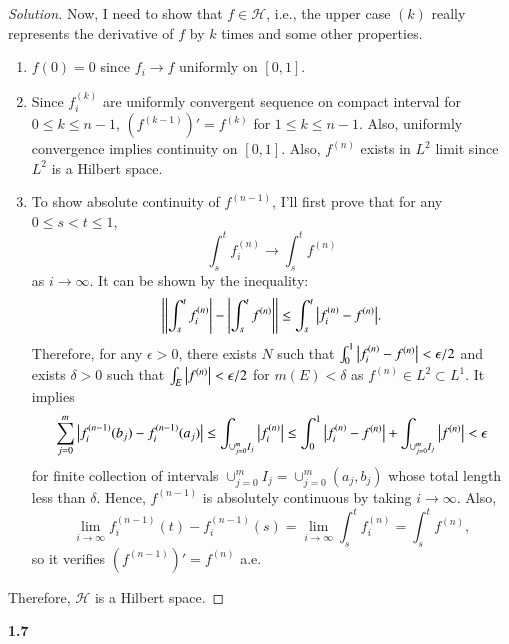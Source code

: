 \documentclass[a4paper, 12pt]{article}
\theoremstyle{Mydefinition}
\theoremstyle{Mytheorem}
\begin{document}
\begin{proof}[Solution]
Now, I need to show that $f\in \mathscr{H}$, i.e., the upper case $(k)$ really represents the derivative of $f$ by $k$ times and some other properties.
\begin{enumerate}
    \item $f(0) = 0$ since $f_i\rightarrow f$ uniformly on $[0,1]$.
    \item Since $f_i^{(k)}$ are uniformly convergent sequence on compact interval for $0\leq k\leq n-1$, $(f^{(k-1)})' = f^{(k)}$ for $1\leq k\leq n-1$. Also, uniformly convergence implies continuity on $[0,1]$. Also, $f^{(n)}$ exists in $L^2$ limit since $L^2$ is a Hilbert space.
    \item To show absolute continuity of $f^{(n-1)}$, I'll first prove that for any $0\leq s<t\leq 1$,
    \begin{equation}
        \int_s^t f_i^{(n)}\rightarrow\int_s^t f^{(n)}
    \end{equation}
    as $i\rightarrow \infty$. It can be shown by the inequality:
    \begin{equation}
        \abs{\abs{\int_s^t f_i^{(n)}}-\abs{\int_s^t f^{(n)}}}\leq \int_s^t \abs{f_i^{(n)} - f^{(n)}}.
    \end{equation}
    Therefore, for any $\epsilon>0$, there exists $N$ such that $\int_0^1 \abs{f_i^{(n)} - f^{(n)}}<\epsilon/2$ and exists $\delta>0$ such that $\int_E \abs{f^{(n)}}<\epsilon/2$ for $m(E)<\delta$ as $f^{(n)}\in L^2\subset L^1$. It implies
    \begin{equation}
        \sum_{j=0}^m\abs{f_i^{(n-1)}(b_j)-f_i^{(n-1)}(a_j)}\leq \int_{\cup_{j=0}^m I_j} \abs{f_i^{(n)}}\leq \int_0^1 \abs{f_i^{(n)} - f^{(n)}} + \int_{\cup_{j=0}^m I_j} \abs{f^{(n)}}<\epsilon
    \end{equation}
    for finite collection of intervals $\cup_{j=0}^m I_j = \cup_{j=0}^m (a_j,b_j)$ whose total length less than $\delta$. Hence, $f^{(n-1)}$ is absolutely continuous by taking $i\rightarrow \infty$. Also,
    \begin{equation}
        \lim\limits_{i\rightarrow \infty} f_i^{(n-1)}(t)-f_i^{(n-1)}(s) =  \lim\limits_{i\rightarrow \infty}\int_s^t f_i^{(n)}=\int_s^t f^{(n)},
    \end{equation}
    so it verifies $\left(f^{(n-1)}\right)' = f^{(n)}$ a.e.
\end{enumerate}
Therefore, $\mathscr{H}$ is a Hilbert space.
\end{proof}

\noindent \textbf{1.7}
\end{document}
